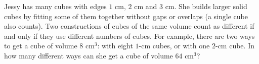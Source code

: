 Jessy has many cubes with edges $1$ cm, $2$ cm and $3$ cm. She builds larger solid cubes by fitting some of them together without gaps or overlaps (a single cube also counts). Two constructions of cubes of the same volume count as different if and only if they use different numbers of cubes. For example, there are two ways to get a cube of volume $8\text{ cm}^3$: with eight $1$-cm cubes, or with one $2$-cm cube. In how many different ways can she get a cube of volume $64\text{ cm}^3$?

